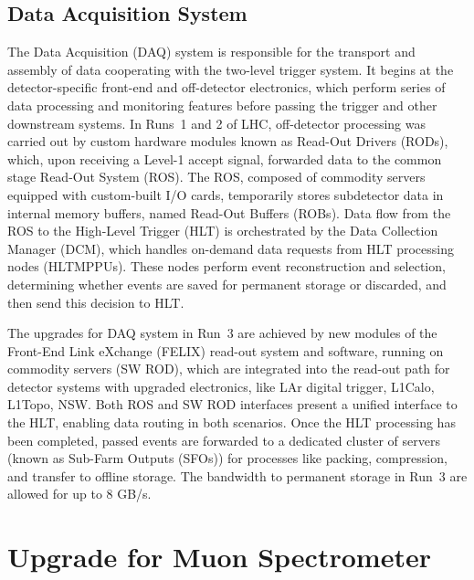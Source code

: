 \subsection{Data Acquisition System}
The Data Acquisition (DAQ) system is responsible for the transport and assembly of data cooperating with the two-level trigger system. It begins at the detector-specific front-end and off-detector electronics, which perform series of data processing and monitoring features before passing the trigger and other downstream systems. In Runs~1 and 2 of LHC, off-detector processing was carried out by custom hardware modules known as Read-Out Drivers (RODs), which, upon receiving a Level-1 accept signal, forwarded data to the common stage Read-Out System (ROS). The ROS, composed of commodity servers equipped with custom-built I/O cards, temporarily stores subdetector data in internal memory buffers, named Read-Out Buffers (ROBs). Data flow from the ROS to the High-Level Trigger (HLT) is orchestrated by the Data Collection Manager (DCM), which handles on-demand data requests from HLT processing nodes (HLTMPPUs). These nodes perform event reconstruction and selection, determining whether events are saved for permanent storage or discarded, and then send this decision to HLT. 

The upgrades for DAQ system in Run~3 are achieved by new modules of the Front-End Link eXchange (FELIX) read-out system and software, running on commodity servers (SW ROD), which are integrated into the read-out path for detector systems with upgraded electronics, like LAr digital trigger, L1Calo, L1Topo, NSW. Both ROS and SW ROD interfaces present a unified interface to the HLT, enabling data routing in both scenarios. Once the HLT processing has been completed, passed events are forwarded to a dedicated cluster of servers (known as Sub-Farm Outputs (SFOs)) for processes like packing, compression, and transfer to offline storage. The bandwidth to permanent storage in Run~3 are allowed for up to 8 GB/s.

\section{Upgrade for Muon Spectrometer} \label{sec:MuonUpgrade}

